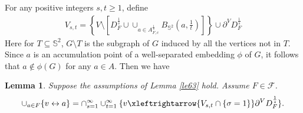 \documentclass[11pt]{amsart}
\theoremstyle{plain}
\newtheorem{lemma}[theorem]{Lemma}
\numberwithin{equation}{section}
\numberwithin{figure}{section}
\begin{document}
For any positive integers $s,t\geq 1$, define
\begin{align*}
V_{s,t}=\left\{V\setminus \left[D_{F}^{\frac{1}{s}}\cup\cup_{a\in A_{F,c}^{\frac{1}{s}}}B_{\mathbb{S}^2}\left(a,\frac{1}{t}\right)\right]\right\}\cup \partial^V D_F^{\frac{1}{s}}%
\end{align*}
Here for $T\subseteq \mathbb{S}^2$, $G\setminus T$ is the subgraph of $G$ induced by all the vertices not in $T$.
Since $a$ is an accumulation point of a well-separated embedding $\phi$ of $G$, it follows that $a\notin \phi(G)$ for any $a\in A$. 
Then we have
\begin{lemma}\label{l39}Suppose the assumptions of Lemma \ref{le63} hold.
Assume $F\in \mathcal{F}$.
\begin{align*}
\cup_{a\in  F}\{v\leftrightarrow a\}=\cap_{s=1}^{\infty}\cup_{t=1}^{\infty}\{v\xleftrightarrow{V_{s,t}\cap\{\sigma=1\}} \partial^V D_{F}^{\frac{1}{s}}\}.
\end{align*}
\end{lemma}
\end{document}
